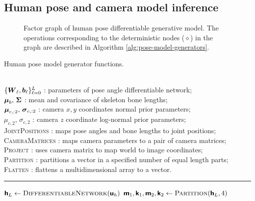 \subsection{Human pose and camera model inference}

\begin{figure}
\centering
{}
\caption[Human pose generative model factor graph.]{Factor graph of human pose differentiable generative model. The operations corresponding to the deterministic nodes ($\diamond$) in the graph are described in Algorithm \ref{alg:pose-model-generators}.}
\label{fig:pose-dgm-factor-graph}
\end{figure}

\begin{algorithm}
\caption{Human pose model generator functions.}
\label{alg:pose-model-generators}
\begin{algorithmic}
\small
    \Require\\
    $\lbrace \boldsymbol{W}_\ell, \boldsymbol{b}_\ell \rbrace_{\ell=0}^L$ : parameters of pose angle differentiable network;\\
    $\boldsymbol{\mu}_b,\,\boldsymbol{\Sigma}$ : mean and covariance of skeleton bone lengths;\\
    $\boldsymbol{\mu}_{c,:2},\,\boldsymbol{\sigma}_{c,:2}$ : camera $x,y$ coordinates normal prior parameters;\\
    $\mu_{c,2},\,\sigma_{c,2}$ : camera $z$ coordinate log-normal prior parameters;\\
    \textsc{JointPositions} : maps pose angles and bone lengths to joint positions;\\
    \textsc{CameraMatrices} : maps camera parameters to a pair of camera matrices;\\
    \textsc{Project} : uses camera matrix to map world  to image coordinates; \\ 
    \textsc{Partition} : partitions a vector in a specified number of equal length parts; \\
    \textsc{Flatten} : flattens a multidimensional array to a vector. \\
\end{algorithmic}
\vspace{-1mm}
\hrule
\vspace{1mm}
\small
\begin{algorithmic}
  \State $\rvct{h}_L \gets \Call{DifferentiableNetwork}{\rvct{u}_h}$
  \State $\rvct{m}_1,\rvct{k}_1,\rvct{m}_2,\rvct{k}_2 \gets \Call{Partition}{\rvct{h}_L, 4}$

\end{algorithmic}
\end{algorithm}
